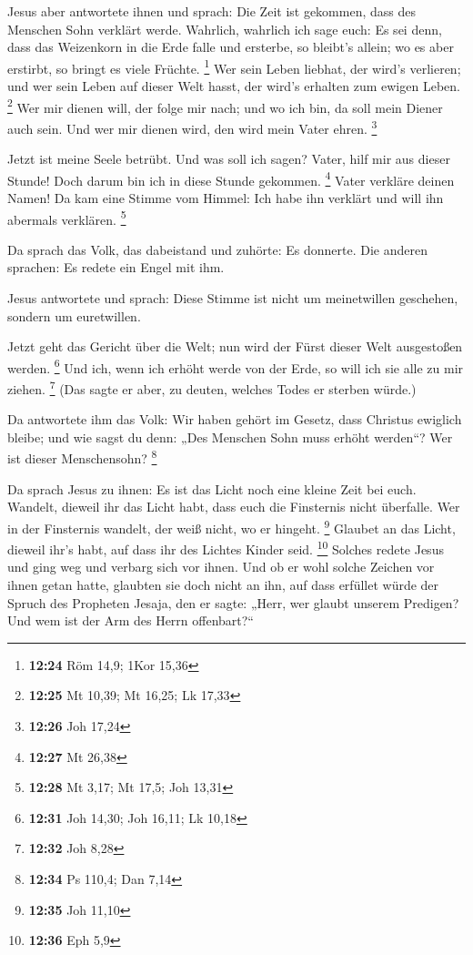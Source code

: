  Jesus aber antwortete ihnen und sprach: Die Zeit ist
gekommen, dass des Menschen Sohn verklärt werde. 
Wahrlich, wahrlich ich sage euch: Es sei denn, dass das Weizenkorn in
die Erde falle und ersterbe, so bleibt's allein; wo es aber erstirbt, so
bringt es viele Früchte. \footnote{\textbf{12:24} Röm 14,9; 1Kor 15,36}
 Wer sein Leben liebhat, der wird's verlieren; und wer
sein Leben auf dieser Welt hasst, der wird's erhalten zum ewigen Leben.
\footnote{\textbf{12:25} Mt 10,39; Mt 16,25; Lk 17,33} 
Wer mir dienen will, der folge mir nach; und wo ich bin, da soll mein
Diener auch sein. Und wer mir dienen wird, den wird mein Vater ehren.
\footnote{\textbf{12:26} Joh 17,24}

 Jetzt ist meine Seele betrübt. Und was soll ich sagen?
Vater, hilf mir aus dieser Stunde! Doch darum bin ich in diese Stunde
gekommen. \footnote{\textbf{12:27} Mt 26,38}  Vater
verkläre deinen Namen! Da kam eine Stimme vom Himmel: Ich habe ihn
verklärt und will ihn abermals verklären. \footnote{\textbf{12:28} Mt
  3,17; Mt 17,5; Joh 13,31}

 Da sprach das Volk, das dabeistand und zuhörte: Es
donnerte. Die anderen sprachen: Es redete ein Engel mit ihm.

 Jesus antwortete und sprach: Diese Stimme ist nicht um
meinetwillen geschehen, sondern um euretwillen.

 Jetzt geht das Gericht über die Welt; nun wird der Fürst
dieser Welt ausgestoßen werden. \footnote{\textbf{12:31} Joh 14,30; Joh
  16,11; Lk 10,18}  Und ich, wenn ich erhöht werde von
der Erde, so will ich sie alle zu mir ziehen. \footnote{\textbf{12:32}
  Joh 8,28}  (Das sagte er aber, zu deuten, welches Todes
er sterben würde.)

 Da antwortete ihm das Volk: Wir haben gehört im Gesetz,
dass Christus ewiglich bleibe; und wie sagst du denn: „Des Menschen Sohn
muss erhöht werden``? Wer ist dieser Menschensohn? \footnote{\textbf{12:34}
  Ps 110,4; Dan 7,14}

 Da sprach Jesus zu ihnen: Es ist das Licht noch eine
kleine Zeit bei euch. Wandelt, dieweil ihr das Licht habt, dass euch die
Finsternis nicht überfalle. Wer in der Finsternis wandelt, der weiß
nicht, wo er hingeht. \footnote{\textbf{12:35} Joh 11,10}
 Glaubet an das Licht, dieweil ihr's habt, auf dass ihr
des Lichtes Kinder seid. \footnote{\textbf{12:36} Eph 5,9}
 Solches redete Jesus und ging weg und verbarg sich vor
ihnen. Und ob er wohl solche Zeichen vor ihnen getan hatte, glaubten sie
doch nicht an ihn,  auf dass erfüllet würde der Spruch
des Propheten Jesaja, den er sagte: „Herr, wer glaubt unserem Predigen?
Und wem ist der Arm des Herrn offenbart?{}``

